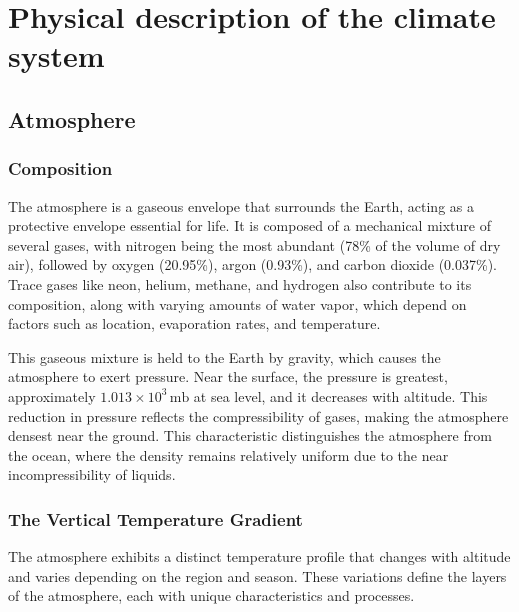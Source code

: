 \chapter{Physical description of the climate system}\label{chapter1}

\section{Atmosphere}
\subsection*{Composition}

The atmosphere is a gaseous envelope that surrounds the Earth, acting as a protective envelope essential for life. It is composed of a mechanical mixture of several gases, with nitrogen being the most abundant (78\% of the volume of dry air), followed by oxygen (20.95\%), argon (0.93\%), and carbon dioxide (0.037\%). Trace gases like neon, helium, methane, and hydrogen also contribute to its composition, along with varying amounts of water vapor, which depend on factors such as location, evaporation rates, and temperature.

This gaseous mixture is held to the Earth by gravity, which causes the atmosphere to exert pressure. Near the surface, the pressure is greatest, approximately $1.013 \times 10^3 \, \mathrm{mb}$ at sea level, and it decreases with altitude. This reduction in pressure reflects the compressibility of gases, making the atmosphere densest near the ground. This characteristic distinguishes the atmosphere from the ocean, where the density remains relatively uniform due to the near incompressibility of liquids.

\subsection*{The Vertical Temperature Gradient}

The atmosphere exhibits a distinct temperature profile that changes with altitude and varies depending on the region and season. These variations define the layers of the atmosphere, each with unique characteristics and processes.

